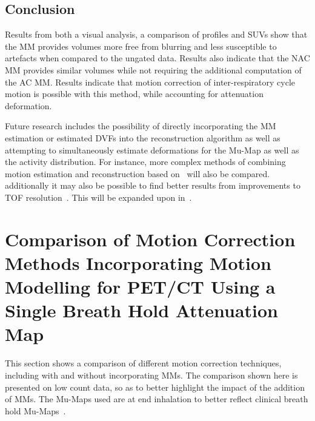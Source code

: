         \subsection{Conclusion} \label{sec:pet_ct_respiratory_motion_correction_with_a_single_attenuation_map_using_nac_derived_deformation_fields_conclusion}
            Results from both a visual analysis, a comparison of profiles and \glspl{SUV} show that the \gls{MM} provides volumes more free from blurring and less susceptible to artefacts when compared to the ungated data. Results also indicate that the \gls{NAC} \gls{MM} provides similar volumes while not requiring the additional computation of the \gls{AC} \gls{MM}. Results indicate that motion correction of inter-respiratory cycle motion is possible with this method, while accounting for attenuation deformation.
            
            Future research includes the possibility of directly incorporating the \gls{MM} estimation or estimated \glspl{DVF} into the reconstruction algorithm as well as  attempting to simultaneously estimate deformations for the \gls{Mu-Map} as well as the activity distribution. For instance, more complex methods of combining motion estimation and reconstruction based on~\parencite{Bousse2016a, Bousse2016} will also be compared. additionally it may also be possible to find better results from improvements to \gls{TOF} resolution~\parencite{Nikos2019, Efthimiou2017, efth2016}. This will be expanded upon in~.
    
    \section{Comparison of Motion Correction Methods Incorporating Motion Modelling for PET/CT Using a Single Breath Hold Attenuation Map} \label{sec:comparison_of_motion_correction_methods_incorporating_motion_modelling_for_pet_ct_using_a_single_breath_hold_attenuation_map}
        This section shows a comparison of different motion correction techniques, including with and without incorporating \glspl{MM}. The comparison shown here is presented on low count data, so as to better highlight the impact of the addition of \glspl{MM}. The \glspl{Mu-Map} used are at end inhalation to better reflect clinical breath hold \glspl{Mu-Map}~\parencite{Whitehead2021ComparisonMap}.
        
